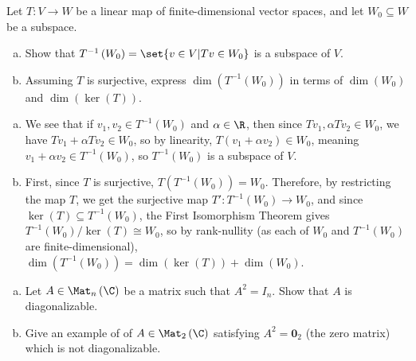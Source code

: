 \documentclass[10pt]{mypackage}
\begin{document}
\begin{problem}
  Let $T\colon V\rightarrow W$ be a linear map of finite-dimensional vector spaces, and let $W_0\subseteq W$ be a subspace.
  \begin{enumerate}[(a)]
    \item Show that $T^{-1}\left( W_0 \right) = \set{v\in V | Tv\in W_0}$ is a subspace of $V$.
    \item Assuming $T$ is surjective, express $\dim \left( T^{-1}\left( W_0 \right) \right)$ in terms of $\dim\left( W_0 \right)$ and $\dim\left( \ker\left( T \right) \right)$.
  \end{enumerate}
\end{problem}
\begin{solution}\hfill
  \begin{enumerate}[(a)]
    \item We see that if $v_1,v_2\in T^{-1}\left( W_0 \right)$ and $\alpha\in\R$, then since $Tv_1,\alpha Tv_2\in W_0$, we have $Tv_1 + \alpha Tv_2 \in W_0$, so by linearity, $T\left( v_1 + \alpha v_2 \right)\in W_0$, meaning $v_1 + \alpha v_2\in T^{-1}\left( W_0 \right)$, so $T^{-1}\left( W_0 \right)$ is a subspace of $V$.
    \item First, since $T$ is surjective, $T\left( T^{-1}\left( W_0 \right) \right) = W_0$. Therefore, by restricting the map $T$, we get the surjective map $T'\colon T^{-1}\left( W_0 \right)\rightarrow W_0$, and since $\ker\left( T \right)\subseteq T^{-1}\left( W_0 \right)$, the First Isomorphism Theorem gives $T^{-1}\left( W_0 \right)/\ker\left( T \right)\cong W_0$, so by rank-nullity (as each of $W_0$ and $T^{-1}\left( W_0 \right)$ are finite-dimensional), $\dim\left( T^{-1}\left( W_0 \right) \right) = \dim\left( \ker\left( T \right) \right) + \dim\left( W_0 \right)$.
  \end{enumerate}
\end{solution}
\begin{problem}[Problem 7]\hfill
  \begin{enumerate}[(a)]
    \item Let $A\in \Mat_{n}\left( \C \right)$ be a matrix such that $A^2 = I_{n}$. Show that $A$ is diagonalizable.
    \item Give an example of of $A\in \Mat_{2}\left( \C \right)$ satisfying $A^2 = \mathbf{0}_{2}$ (the zero matrix) which is not diagonalizable.
  \end{enumerate}
\end{problem}
\end{document}
